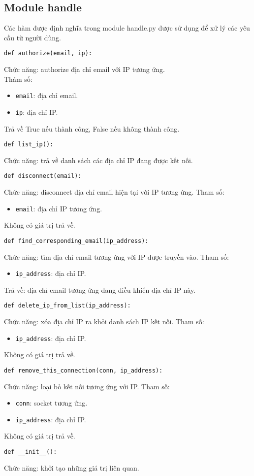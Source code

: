 \subsection{Module handle}
Các hàm được định nghĩa trong module handle.py được sử dụng để xử lý các yêu cầu từ người dùng.
\begin{lstlisting}
def authorize(email, ip):
\end{lstlisting}
Chức năng: authorize địa chỉ email với IP tương ứng.\\
Thám số: 
\begin{itemize}
\item \lstinline{email}: địa chỉ email.
\item \lstinline{ip}: địa chỉ IP.
\end{itemize}
Trả về True nếu thành công, False nếu không thành công.

\begin{lstlisting}
def list_ip():
\end{lstlisting}
Chức năng: trả về danh sách các địa chỉ IP đang được kết nối.

\begin{lstlisting}
def disconnect(email):
\end{lstlisting}
Chức năng: disconnect địa chỉ email hiện tại với IP tương ứng.
Tham số:
\begin{itemize}
\item \lstinline{email}: địa chỉ IP tương ứng.
\end{itemize}
Không có giá trị trả về.

\begin{lstlisting}
def find_corresponding_email(ip_address):
\end{lstlisting}
Chức năng: tìm địa chỉ email tương ứng với IP được truyền vào.
Tham số:
\begin{itemize}
\item \lstinline{ip_address}: địa chỉ IP.
\end{itemize}
Trả về: địa chỉ email tương ứng đang điều khiển địa chỉ IP này.

\begin{lstlisting}
def delete_ip_from_list(ip_address):
\end{lstlisting}
Chức năng: xóa địa chỉ IP ra khỏi danh sách IP kết nối.
Tham số: 
\begin{itemize}
\item \lstinline{ip_address}: địa chỉ IP.
\end{itemize}
Không có giá trị trả về.

\begin{lstlisting}
def remove_this_connection(conn, ip_address):
\end{lstlisting}
Chức năng: loại bỏ kết nối tương ứng với IP.
Tham số:
\begin{itemize}
\item \lstinline{conn}: socket tương ứng.
\item \lstinline{ip_address}: địa chỉ IP.
\end{itemize}
Không có giá trị trả về.

\begin{lstlisting}
def __init__():
\end{lstlisting}
Chức năng: khởi tạo những giá trị liên quan.